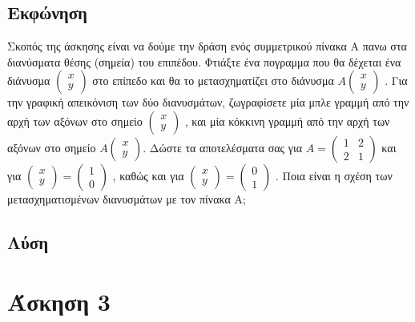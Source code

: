 \documentclass[a4paper,12pt]{article}
\begin{document}
\subsection{Εκφώνηση}
Σκοπός της άσκησης είναι να δούμε την δράση ενός συμμετρικού πίνακα A πανω στα διανύσματα θέσης (σημεία)
του επιπέδου. Φτιάξτε ένα πογραμμα που θα δέχεται ένα διάνυσμα
$
    \begin{pmatrix}
        x \\
        y
    \end{pmatrix}
$
στο επίπεδο και θα το μετασχηματίζει στο διάνυσμα
$
    A
    \begin{pmatrix}
        x \\
        y
    \end{pmatrix}
$
. Για την γραφική απεικόνιση των δύο διανυσμάτων, ζωγραφίσετε μία μπλε γραμμή από την αρχή των αξόνων
στο σημείο
$
    \begin{pmatrix}
        x \\
        y
    \end{pmatrix}
$
, και μία κόκκινη γραμμή από την αρχή των αξόνων στο σημείο
$
    A
    \begin{pmatrix}
        x \\
        y
    \end{pmatrix}
$. Δώστε τα αποτελέσματα σας για
$
    A=\begin{pmatrix}
        1 & 2 \\
        2 & 1
    \end{pmatrix}
$
και για
$
    \begin{pmatrix}
        x \\
        y
    \end{pmatrix}=\begin{pmatrix}
        1 \\
        0
    \end{pmatrix}
$
, καθώς και για
$
    \begin{pmatrix}
        x \\
        y
    \end{pmatrix}=\begin{pmatrix}
        0 \\
        1
    \end{pmatrix}
$
. Ποια είναι η σχέση των μετασχηματισμένων διανυσμάτων με τον πίνακα Α;
\subsection{Λύση}
\newpage\section{Άσκηση 3}
\end{document}
